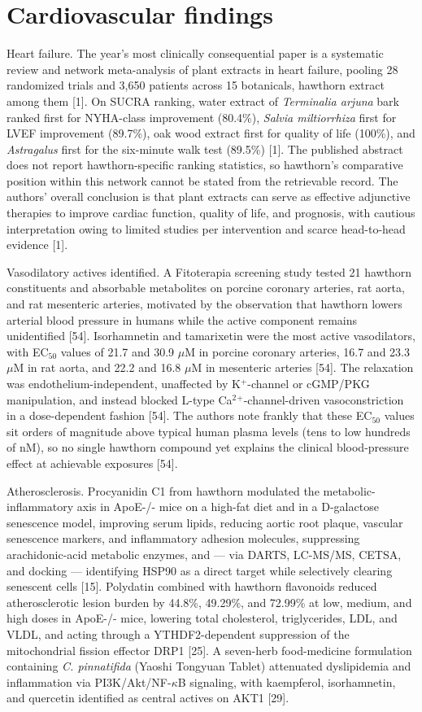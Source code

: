 \documentclass[11pt]{article}
\begin{document}
\section*{Cardiovascular findings}
Heart failure. The year's most clinically consequential paper is a systematic review and network meta-analysis of plant extracts in heart failure, pooling 28 randomized trials and 3,650 patients across 15 botanicals, hawthorn extract among them [1]. On SUCRA ranking, water extract of \emph{Terminalia arjuna} bark ranked first for NYHA-class improvement (80.4\%), \emph{Salvia miltiorrhiza} first for LVEF improvement (89.7\%), oak wood extract first for quality of life (100\%), and \emph{Astragalus} first for the six-minute walk test (89.5\%) [1]. The published abstract does not report hawthorn-specific ranking statistics, so hawthorn's comparative position within this network cannot be stated from the retrievable record. The authors' overall conclusion is that plant extracts can serve as effective adjunctive therapies to improve cardiac function, quality of life, and prognosis, with cautious interpretation owing to limited studies per intervention and scarce head-to-head evidence [1].

Vasodilatory actives identified. A Fitoterapia screening study tested 21 hawthorn constituents and absorbable metabolites on porcine coronary arteries, rat aorta, and rat mesenteric arteries, motivated by the observation that hawthorn lowers arterial blood pressure in humans while the active component remains unidentified [54]. Isorhamnetin and tamarixetin were the most active vasodilators, with EC$_{50}$ values of 21.7 and 30.9 $\mu$M in porcine coronary arteries, 16.7 and 23.3 $\mu$M in rat aorta, and 22.2 and 16.8 $\mu$M in mesenteric arteries [54]. The relaxation was endothelium-independent, unaffected by K$^+$-channel or cGMP/PKG manipulation, and instead blocked L-type Ca$^2$$^+$-channel-driven vasoconstriction in a dose-dependent fashion [54]. The authors note frankly that these EC$_{50}$ values sit orders of magnitude above typical human plasma levels (tens to low hundreds of nM), so no single hawthorn compound yet explains the clinical blood-pressure effect at achievable exposures [54].

Atherosclerosis. Procyanidin C1 from hawthorn modulated the metabolic-inflammatory axis in ApoE-/- mice on a high-fat diet and in a D-galactose senescence model, improving serum lipids, reducing aortic root plaque, vascular senescence markers, and inflammatory adhesion molecules, suppressing arachidonic-acid metabolic enzymes, and --- via DARTS, LC-MS/MS, CETSA, and docking --- identifying HSP90 as a direct target while selectively clearing senescent cells [15]. Polydatin combined with hawthorn flavonoids reduced atherosclerotic lesion burden by 44.8\%, 49.29\%, and 72.99\% at low, medium, and high doses in ApoE-/- mice, lowering total cholesterol, triglycerides, LDL, and VLDL, and acting through a YTHDF2-dependent suppression of the mitochondrial fission effector DRP1 [25]. A seven-herb food-medicine formulation containing \emph{C. pinnatifida} (Yaoshi Tongyuan Tablet) attenuated dyslipidemia and inflammation via PI3K/Akt/NF-$\kappa$B signaling, with kaempferol, isorhamnetin, and quercetin identified as central actives on AKT1 [29].
\end{document}
